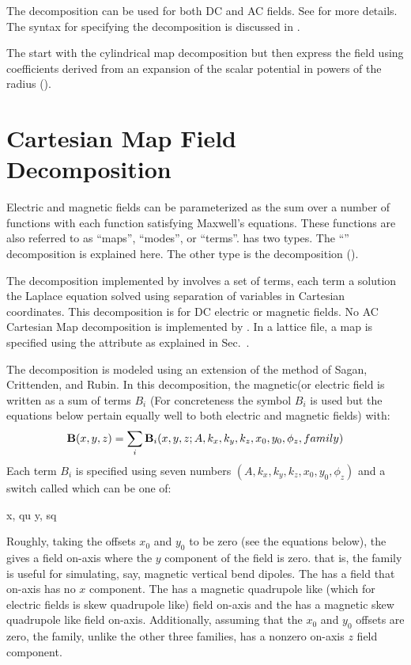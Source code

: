The  decomposition can be used for both DC and AC fields. See
 for more details. The syntax for specifying the 
decomposition is discussed in .

The  start with the cylindrical map decomposition but then express the
field using coefficients derived from an expansion of the scalar potential in powers of the radius
().

\section{Cartesian Map Field Decomposition}
\label{s:cart.map.phys}

Electric and magnetic fields can be parameterized as the sum over a number of functions
with each function satisfying Maxwell's equations. These functions are also referred to as
``maps'', ``modes'', or ``terms''. \bmad has two types. The ``''
decomposition is explained here. The other type is the  decomposition
().

The  decomposition implemented by \bmad involves a set of terms, each
term a solution the Laplace equation solved using separation of variables in Cartesian
coordinates. This decomposition is for DC electric or magnetic fields. No AC Cartesian Map
decomposition is implemented by \bmad. In a lattice file, a  map is specified using
the  attribute as explained in Sec.~.

The  decomposition is modeled using an extension of the method of Sagan,
Crittenden, and Rubin\cite{b:wiggler}. In this decomposition, the magnetic(or electric
field is written as a sum of terms $B_i$ (For concreteness the symbol $B_i$ is used but
the equations below pertain equally well to both electric and magnetic fields) with:
\begin{equation}
  {\bf B}(x,y,z) = \sum_i {\bf B}_i(x, y, z; A, k_x, k_y, k_z, x_0, y_0, \phi_z, family)
\end{equation}
Each term $B_i$ is specified using seven numbers $(A, k_x, k_y, k_z,
x_0, y_0, \phi_z)$ and a switch called  which can be one of:
\begin{example}
  x,  qu
  y,  sq
\end{example}
Roughly, taking the offsets $x_0$ and $y_0$ to be zero (see the equations below), the 
 gives a field on-axis where the $y$ component of the field is zero. that is, the 
family is useful for simulating, say, magnetic vertical bend dipoles. The   has a
field that on-axis has no $x$ component. The   has a magnetic quadrupole like
(which for electric fields is skew quadrupole like) field on-axis and the   has a
magnetic skew quadrupole like field on-axis. Additionally, assuming that the $x_0$ and $y_0$ offsets
are zero, the  family, unlike the other three families, has a nonzero on-axis $z$ field
component.

